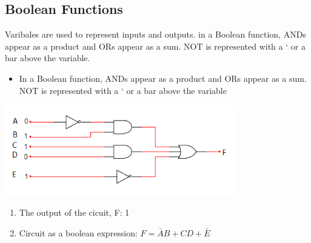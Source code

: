 \documentclass[a4paper,12pt]{article}
\begin{document}
        \subsection*{Boolean Functions}
            Varibales are used to represent inputs and outputs. in a Boolean function, ANDs appear as a product and ORs appear as a sum. NOT is represented with a ‘ or a bar above the variable.
            \begin{itemize}
                \item In a Boolean function, ANDs appear as a product and ORs appear as a sum. NOT is represented with a ‘ or a bar above the variable
            \end{itemize}
            \includegraphics*[width=10cm]{circuit1.png}
            \begin{enumerate}
                \item The output of the cicuit, F: 1
                \item Circuit as a boolean expression: $F=\bar{A}B+CD+\bar{E}$
            \end{enumerate}
\end{document}
